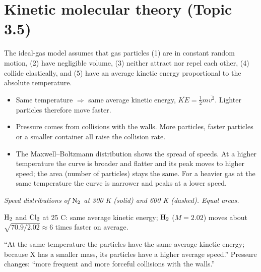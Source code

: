 \documentclass[11pt]{article}
\begin{document}
\section{Kinetic molecular theory (Topic 3.5)}\label{t:3.5}
The ideal-gas model assumes that gas particles (1) are in constant random motion, (2) have negligible volume, (3) neither attract nor repel each other, (4) collide elastically, and (5) have an average kinetic energy proportional to the absolute temperature.
\begin{itemize}
\item Same temperature $\Rightarrow$ same average kinetic energy, $\overline{KE} = \tfrac12 m\overline{v^2}$. Lighter particles therefore move faster.
\item Pressure comes from collisions with the walls. More particles, faster particles or a smaller container all raise the collision rate.
\item The Maxwell--Boltzmann distribution shows the spread of speeds. At a higher temperature the curve is broader and flatter and its peak moves to higher speed; the area (number of particles) stays the same. For a heavier gas at the same temperature the curve is narrower and peaks at a lower speed.
\end{itemize}
\begin{center}

{\small\itshape Speed distributions of $\ce{N2}$ at 300 K (solid) and 600 K (dashed). Equal areas.}
\end{center}
 $\ce{H2}$ and $\ce{Cl2}$ at 25 \textdegree C: same average kinetic energy; $\ce{H2}$ ($M = 2.02$) moves about $\sqrt{70.9/2.02} \approx 6$ times faster on average.

\frph ``At the same temperature the particles have the same average kinetic energy; because X has a smaller mass, its particles have a higher average speed.'' Pressure changes: ``more frequent and more forceful collisions with the walls.''
\end{document}
